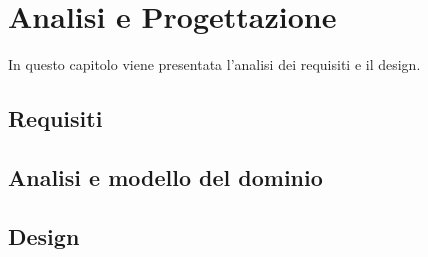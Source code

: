 \chapter{Analisi e Progettazione}
\label{chapter:analysis}
In questo capitolo viene presentata l'analisi dei requisiti e il design.

\section{Requisiti}

\section{Analisi e modello del dominio}

\section{Design}
